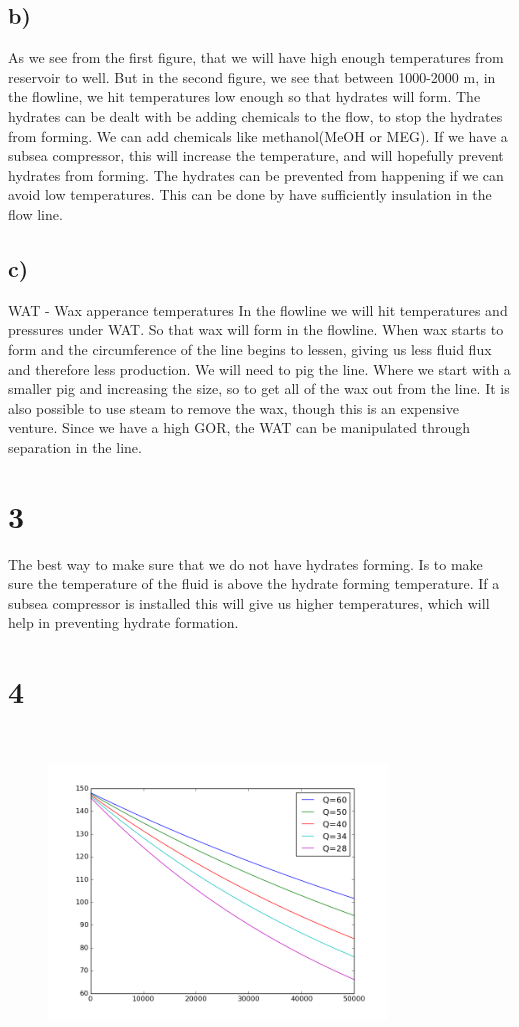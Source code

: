 \documentclass[DIV=calc, paper=a4, fontsize=13pt, twocolumn]{scrartcl}	 %
\begin{document}
\subsection*{b)}
As we see from the first figure, that we will have high enough temperatures from reservoir to well. But in the second figure, we see that between 1000-2000 m, in the flowline, we hit temperatures low enough so that hydrates will form. 
The hydrates can be dealt with be adding chemicals to the flow, to stop the hydrates from forming. We can add chemicals like methanol(MeOH or MEG). 
\newline
If we have a subsea compressor, this will increase the temperature, and will hopefully prevent hydrates from forming. 
\newline
The hydrates can be prevented from happening if we can avoid low temperatures. This can be done by have sufficiently insulation in the flow line.
\subsection*{c)}
WAT - Wax apperance temperatures
In the flowline we will hit temperatures and pressures under WAT. So that wax will form in the flowline. When wax starts to form and the circumference of the line begins to lessen, giving us less fluid flux and therefore less production. We will need to pig the line. Where we start with a smaller pig and increasing the size, so to get all of the wax out from the line. It is also possible to use steam to remove the wax, though this is an expensive venture.
Since we have a high GOR, the WAT can be manipulated through separation in the line.
\section*{3}
The best way to make sure that we do not have hydrates forming. Is to make sure the temperature of the fluid is above the hydrate forming temperature. If a subsea compressor is installed this will give us higher temperatures, which will help in preventing hydrate formation.

\section*{4}
\begin{figure}[h]
\includegraphics[width=9cm,height=8.5cm]{Temp_insulated.png}
\end{figure}
\end{document}
